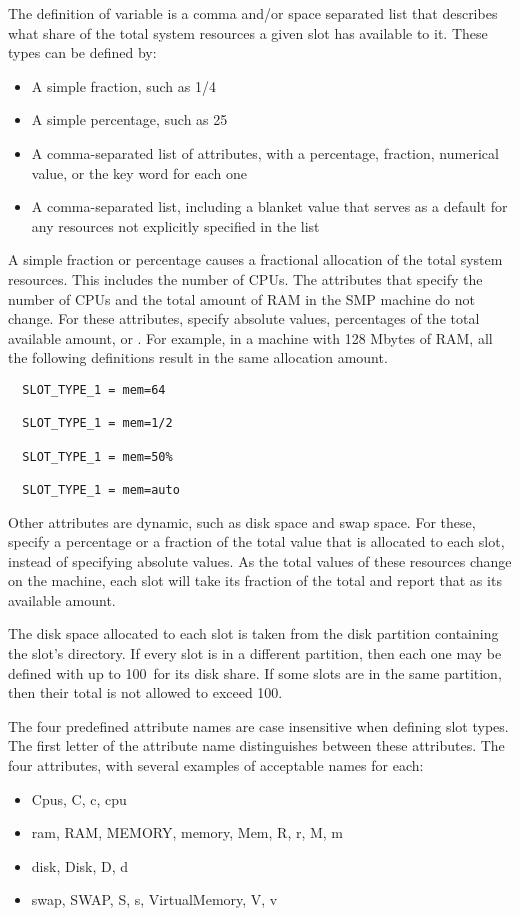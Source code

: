 \begin{description}
The definition of variable 
is a comma and/or space separated list that
describes what share of the total system resources a given
slot has available to it.
These types can be defined by:
\begin{itemize}
  \item A simple fraction, such as 1/4
  \item A simple percentage, such as 25\Percent
  \item A comma-separated list of attributes, with a percentage,
	fraction, numerical value, or the key word  for each one
  \item A comma-separated list, including a blanket value that serves
        as a default for any resources not explicitly specified in the list
\end{itemize}
A simple fraction or percentage causes a fractional allocation
of the total system resources.
This includes the number of CPUs.
The attributes that specify the number of CPUs
and the total amount of RAM in
the SMP machine do not change.
For these attributes, specify absolute values,
percentages of the total available amount, or .  
For example, in a machine with 128 Mbytes of RAM,
all the following definitions result in the same allocation amount.
\begin{verbatim}
  SLOT_TYPE_1 = mem=64

  SLOT_TYPE_1 = mem=1/2

  SLOT_TYPE_1 = mem=50%

  SLOT_TYPE_1 = mem=auto
\end{verbatim}

Other attributes are dynamic, such as disk space and swap space.
For these, specify a percentage or a fraction of the total
value that is allocated to each slot, instead of specifying absolute values.
As the total values of these resources change on the machine,
each slot will take its fraction of the total and report that as its
available amount.

The disk space allocated to each slot is taken from the disk partition
containing the slot's  directory. 
If every slot is in a different partition, 
then each one may be defined with up to
100\Percent\ for its disk share.
If some slots are in the same partition, 
then their total is not allowed to exceed 100\Percent.

The four predefined attribute names are case insensitive when defining 
slot types.
The first letter of the attribute name distinguishes between
these attributes.
The four attributes, with several examples of acceptable names for each:
\begin{itemize}
  \item Cpus, C, c, cpu 
  \item ram, RAM, MEMORY, memory, Mem, R, r, M, m
  \item disk, Disk, D, d
  \item swap, SWAP, S, s, VirtualMemory, V, v
\end{itemize}


\end{description}
